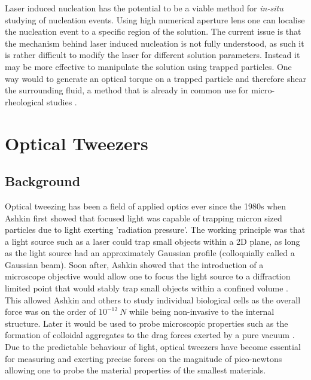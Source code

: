 Laser induced nucleation has the potential to be a viable method 
for \textit{in-situ} studying of nucleation events. Using high 
numerical aperture lens one can localise the nucleation event 
to a specific region of the solution. The current issue is that 
the mechanism behind laser induced nucleation is not fully 
understood, as such it is rather difficult to modify the laser 
for different solution parameters. Instead it may be more 
effective to manipulate the solution using trapped particles. 
One way would to generate an optical torque on a trapped particle
and therefore shear the surrounding fluid, a method that is 
already in common use for micro-rheological studies \cite{Bishop2004, 
RobertsonAnderson2018}. 

\section{Optical Tweezers}
\subsection{Background}
Optical tweezing has been a field of applied optics ever since 
the 1980s when Ashkin \cite{Ashkin1970} first showed that focused 
light was capable of trapping micron sized particles due to light 
exerting 'radiation pressure'. The working principle was that a 
light source such as a laser could trap small objects within a 2D 
plane, as long as the light source had an approximately Gaussian 
profile (colloquially called a Gaussian beam). Soon after, Ashkin 
showed that the introduction of a microscope objective would allow 
one to focus the light source to a diffraction limited point that 
would stably trap small objects within a confined volume 
\cite{Ashkin1980}. This allowed Ashkin and others to study individual 
biological cells as the overall force was on the order of $10^{-12}\ 
N$ while being non-invasive to the internal structure. Later it would 
be used to probe microscopic properties such as the formation of 
colloidal aggregates \cite{Yi2021} to the drag forces exerted by a 
pure vacuum \cite{Ahn2018, Monteiro2018}. Due to the predictable 
behaviour of light, optical tweezers have become essential for 
measuring and exerting precise forces on the magnitude of pico-newtons 
allowing one to probe the material properties of the smallest 
materials. 

